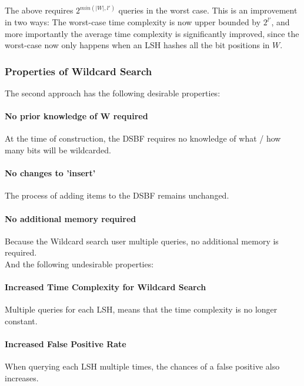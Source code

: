 \documentclass[a4paper,11pt]{article}
\begin{document}
The above requires $2^{min(|W|, l')}$ queries in the worst case.
This is an improvement in two ways: The worst-case time complexity is now upper bounded by $2^{l'}$, and more importantly the average time complexity is significantly improved, since the worst-case now only happens when an LSH hashes all the bit positions in $W$.

\subsubsection*{Properties of Wildcard Search}
The second approach has the following desirable properties:
\paragraph{No prior knowledge of W required} At the time of construction, the DSBF requires no knowledge of what / how many bits will be wildcarded.

\paragraph{No changes to 'insert'} The process of adding items to the DSBF remains unchanged.

\paragraph{No additional memory required} Because the Wildcard search user multiple queries, no additional memory is required.
\\

And the following undesirable properties:
\paragraph{Increased Time Complexity for Wildcard Search} Multiple queries for each LSH, means that the time complexity is no longer constant.

\paragraph{Increased False Positive Rate} When querying each LSH multiple times, the chances of a false positive also increases.
\end{document}
